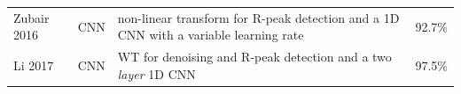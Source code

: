 \documentclass[journal]{IEEEtran}
\begin{document}
\begin{table}[!t]
\begin{minipage}{\textwidth}
\begin{tabularx}{\textwidth}{l c l l}
			Zubair 2016\cite{zubair2016automated}          & CNN            & non-linear transform for R-peak detection and a 1D CNN with a variable learning rate                       & 92.7\%                                                                                                                                                                                                                                                                                                                                                                                                                                                                                                                                                                                                                                                                                                                                                                                                                                                                                                   \\
			Li 2017\cite{li2017classification}             & CNN            & WT for denoising and R-peak detection and a two \textit{layer} 1D CNN                                      & 97.5\%                                                                                                                                                                                                                                                                                                                                                                                                                                                                                                                                                                                                                                                                                                                                                                                                                                                                                                   \\

\end{tabularx}
\end{minipage}
\end{table}
\end{document}
